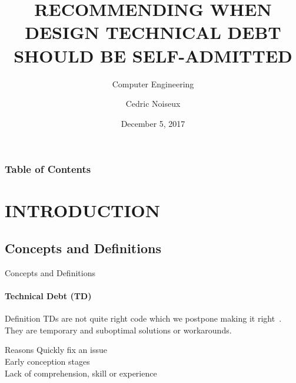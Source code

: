 \documentclass{beamer}
\title{
RECOMMENDING WHEN DESIGN TECHNICAL DEBT SHOULD BE SELF-ADMITTED} %
\subtitle{Computer Engineering} %
\author{Cedric Noiseux}
\date{December 5, 2017}
\begin{document}
	\begin{darkframes}
		
		\frame{\maketitle}
  
  		
		\begin{frame}[allowframebreaks]
			\frametitle{Table of Contents}
			\tableofcontents[sections={1-2}]
				\framebreak
			\tableofcontents[sections={3-4}]
		\end{frame}
	
		\section{INTRODUCTION}
		
	
			\subsection{Concepts and Definitions}	  
				\begin{frame}{Concepts and Definitions}	
					\framesubtitle{Technical Debt (TD)}	
					\begin{block}{Definition}
						TDs are not quite right code which we postpone making it right~\cite{cunn92}. They are temporary and suboptimal solutions or workarounds.
					\end{block}
					\begin{block}{Reasons}
						Quickly fix an issue\\
						Early conception stages\\
						Lack of comprehension, skill or experience	
					\end{block}
				\end{frame}
						

\end{darkframes}
\end{document}
